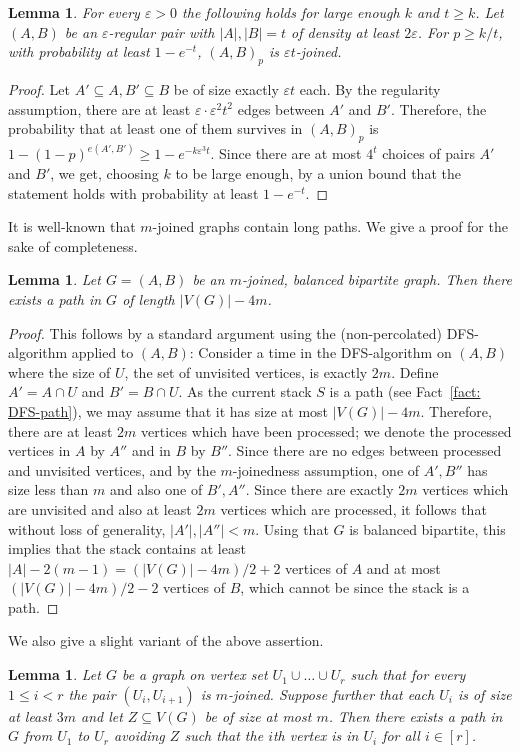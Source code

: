 \documentclass[10pt]{article}
\newtheorem{lemma}[theorem]{Lemma}
\theoremstyle{definition}
\newcommand\eps{\varepsilon}
\let\leq\leqslant
\let\geq\geqslant
\begin{document}
\begin{lemma}\label{lem: random joined}
    For every $\varepsilon>0$ the following holds for large enough $k$ and $t\geq k$. Let $(A,B)$ be an $\eps$-regular pair with $|A|,|B|=t$ of density at least $2\varepsilon$. For $p\geq k/t$, with probability at least $1-e^{-t}$, $(A,B)_p$ is $\varepsilon t$-joined.
\end{lemma}
\begin{proof}
    Let $A'\subseteq A,B'\subseteq B$ be of size exactly $\eps t$ each. By the regularity assumption, there are at least $\varepsilon\cdot \varepsilon^2t^2$ edges between $A'$ and $B'$. Therefore, the probability that at least one of them survives in $(A,B)_p$ is $1-(1-p)^{e(A',B')}\geq1-e^{-k\varepsilon^3t}$. Since there are at most $4^t$ choices of pairs $A'$ and $B'$, we get, choosing $k$ to be large enough, by a union bound that the statement holds with probability at least $1-e^{-t}$.
\end{proof}
It is well-known that $m$-joined graphs contain long paths. We give a proof for the sake of completeness.
\begin{lemma}\label{lem: DFS bipartite holes}
    Let $G=(A,B)$ be an $m$-joined, balanced bipartite graph. Then there exists a path in $G$ of length $|V(G)|-4m$.
\end{lemma}
\begin{proof} This follows by a standard argument using the (non-percolated) DFS-algorithm applied to $(A,B)$: Consider a time in the DFS-algorithm on $(A,B)$ where the size of $U$, the set of unvisited vertices, is exactly $2m$. Define $A'=A\cap U$ and $B'=B\cap U$. As the current stack $S$ is a path (see Fact~\ref{fact: DFS-path}), we may assume that it has size at most $|V(G)|-4m$. Therefore, there are at least $2m$ vertices which have been processed; we denote the processed vertices in $A$ by $A''$ and in $B$ by $B''$. Since there are no edges between processed and unvisited vertices, and by the $m$-joinedness assumption, one of $A',B''$ has size less than $m$ and also one of $B',A''$. Since there are exactly $2m$ vertices which are unvisited and also at least $2m$ vertices which are processed, it follows that without loss of generality, $|A'|,|A''|<m$. Using that $G$ is balanced bipartite, this implies that the stack contains at least $|A|-2(m-1)=(|V(G)|-4m)/2+2$ vertices of $A$ and at most $(|V(G)|-4m)/2-2$ vertices of $B$, which cannot be since the stack is a path. 
\end{proof}
We also give a slight variant of the above assertion.
\begin{lemma}\label{lem: regularity connector}
    Let $G$ be a graph on vertex set $U_1\cup\ldots\cup U_r$ such that for every $1\leq i< r$ the pair $(U_i,U_{i+1})$ is $m$-joined. Suppose further that each $U_i$ is of size at least $3m$ and let $Z\subseteq V(G)$ be of size at most $m$. Then there exists a path in $G$ from $U_1$ to $U_r$ avoiding $Z$ such that the $i$th vertex is in $U_i$ for all $i \in [r]$.
\end{lemma}
\end{document}
